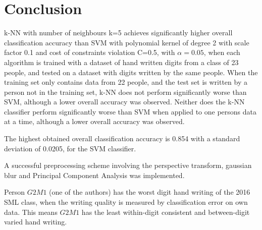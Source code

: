\section{Conclusion}
\label{sec:conclusion}
k-NN with number of neighbours k=5 achieves significantly higher overall 
classification accuracy than SVM with polynomial kernel of degree 2
with scale factor 0.1 and cost of constraints violation C=0.5,
with \(\alpha=0.05\),
when each algorithm is trained with a dataset of hand written digits
from a class of 23 people, and tested on a dataset
with digits written by the same people.
When the training set only contains data from 22 people,
and the test set is written by a person not in the training
set, k-NN does not perform significantly worse
than SVM, although a lower overall accuracy was observed.
Neither does the k-NN classifier perform significantly worse than SVM
when applied to one persons data at a time,
although a lower overall accuracy was observed.

The highest obtained overall classification accuracy is 0.854 with a standard
deviation of 0.0205, for the SVM classifier.

A successful preprocessing scheme involving the perspective transform,
gaussian blur and Principal Component Analysis was implemented.

Person \(G2M1\) (one of the authors) has the worst digit hand writing of the 2016 SML class,
when the writing quality is measured by classification
error on own data. This means \(G2M1\) has the least
within-digit consistent and between-digit varied
hand writing.